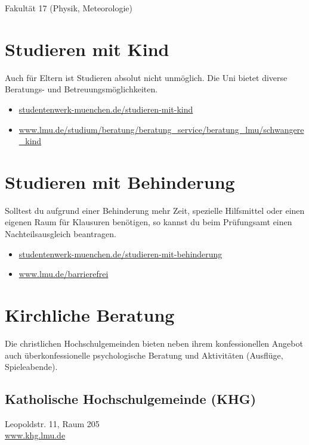 Fakultät 17 (Physik, Meteorologie)\newline
\begin{urlList}
\end{urlList}

\section{Studieren mit Kind}

Auch für Eltern ist Studieren absolut nicht unmöglich. Die Uni bietet diverse Beratungs- und Betreuungsmöglichkeiten.

\begin{itemize}
	\item \url{studentenwerk-muenchen.de/studieren-mit-kind}
	\item \url{www.lmu.de/studium/beratung/beratung_service/beratung_lmu/schwangere_kind}
\end{itemize}

\section{Studieren mit Behinderung}

Solltest du aufgrund einer Behinderung mehr Zeit, spezielle Hilfsmittel oder einen eigenen Raum für Klausuren benötigen, so kannst du beim Prüfungsamt einen Nachteilsausgleich beantragen.

\begin{itemize}
	\item \url{studentenwerk-muenchen.de/studieren-mit-behinderung}
	\item \url{www.lmu.de/barrierefrei}
\end{itemize}



\section{Kirchliche Beratung}
Die christlichen Hochschulgemeinden bieten neben ihrem konfessionellen Angebot auch überkonfessionelle psychologische Beratung und Aktivitäten (Ausflüge, Spieleabende).

\subsection*{Katholische Hochschulgemeinde (KHG)}
Leopoldstr. 11, Raum 205\\
\url{www.khg.lmu.de}

